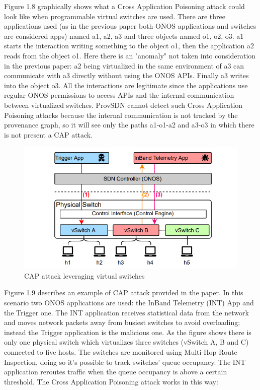 Figure 1.8 graphically shows what a Cross Application Poisoning attack could look like when programmable virtual switches are used. There are three applications used (as in the previous paper both ONOS applications and switches are considered apps) named a1, a2, a3 and three objects named o1, o2, o3. a1 starts the interaction writing something to the object o1, then the application a2 reads from the object o1. Here there is an "anomaly" not taken into consideration in the previous paper: a2 being virtualized in the same environment of a3 can communicate with a3 directly without using the ONOS APIs. Finally a3 writes into the object o3. All the interactions are legitimate since the applications use regular ONOS permissions to access APIs and the internal communication between virtualized switches. ProvSDN cannot detect such Cross Application Poisoning attacks because the internal communication is not tracked by the provenance graph, so it will see only the paths a1-o1-a2 and a3-o3 in which there is not present a CAP attack.
\begin{figure}[h]
\caption{CAP attack leveraging virtual switches}
\label{fig:vifc}
\includegraphics[width=1.0\textwidth]{resources/Chapter-1/vIFC.png}
\centering
\end{figure}
Figure 1.9 describes an example of CAP attack provided in the paper. In this scenario two ONOS applications are used: the InBand Telemetry (INT) App and the Trigger one. The INT application receives statistical data from the network and moves network packets away from busiest switches to avoid overloading; instead the Trigger application is the malicious one. As the figure shows there is only one physical switch which virtualizes three switches (vSwitch A, B and C) connected to five hosts. The switches are monitored using Multi-Hop Route Inspection, doing so it's possible to track switches' queue occupancy. The INT application reroutes traffic when the queue occupancy is above a certain threshold. The Cross Application Poisoning attack works in this way:
